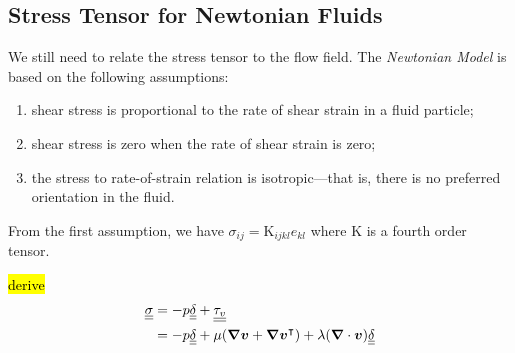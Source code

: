 \subsection{Stress Tensor for Newtonian Fluids}
We still need to relate the stress tensor to the flow field. The \textit{Newtonian Model} is based on the following assumptions:
\begin{enumerate}
    \item shear stress is proportional to the rate of shear strain in a fluid particle;
    \item shear stress is zero when the rate of shear strain is zero;
    \item the stress to rate-of-strain relation is isotropic—that is, there is no preferred orientation in the fluid.
\end{enumerate}
From the first assumption, we have $\sigma_{ij}=\mathrm{K}_{ijkl}e_{kl}$ where $\mathrm{K}$ is a fourth order tensor.

\hl{derive}
\begin{equation}
\begin{split}
\underline{\underline{\sigma}}&= -p\underline{\underline{\delta}}+\underline{\underline{\tau_v}} \\
&= -p\underline{\underline{\delta}} + \mu(\boldsymbol{\nabla}\boldsymbol{v}+\boldsymbol{\nabla}\boldsymbol{v}^\intercal) + \lambda(\boldsymbol{\nabla}\cdot\boldsymbol{v})\underline{\underline{\delta}}
\end{split}
\end{equation}
